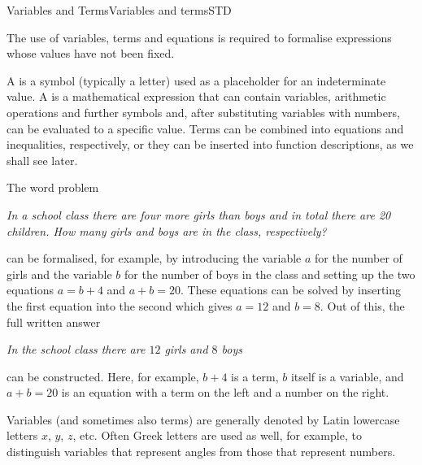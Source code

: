 \begin{MXContent}{Variables and Terms}{Variables and terms}{STD}

The use of variables, terms and equations is required to formalise expressions whose
values have not been fixed.

\begin{MInfo}
A  is a symbol (typically a letter) used as a placeholder for an
indeterminate value. A  is a mathematical expression that can contain variables, arithmetic 
operations and further symbols and, after substituting variables with numbers, can be evaluated to a specific value. 
Terms can be combined into equations and inequalities, respectively, or they can be inserted into function
descriptions, as we shall see later.
\end{MInfo}


\begin{MExample}
The word problem

\textit{In a school class there are four more girls than boys and in total there are 20 children. How many 
girls and boys are in the class, respectively?
}

can be formalised, for example, by introducing the variable $a$ for the number of girls and 
the variable $b$ for the number of boys in the class and setting up the two equations 
$a=b+4$ and $a+b=20$. These equations can be solved by inserting the first equation into 
the second which gives $a=12$ and $b=8$. Out of this, the full written answer 

\textit{In the school class there are $12$ girls and $8$ boys}

can be constructed. Here, for example, $b+4$ is a term, $b$ itself is a variable, and
$a+b=20$ is an equation with a term on the left and a number on the right.
\end{MExample}
Variables (and sometimes also terms) are generally denoted by Latin lowercase letters $x$, $y$, $z$, etc.
Often Greek letters are used as well, for example, to distinguish variables that represent angles from those that represent numbers.


\end{MXContent}
